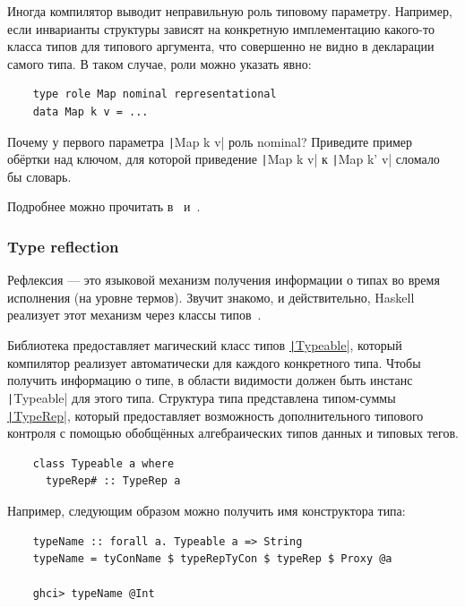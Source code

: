 Иногда компилятор выводит неправильную роль типовому параметру.
Например, если инварианты структуры зависят на конкретную имплементацию какого-то класса типов для типового аргумента, что совершенно не видно в декларации самого типа.
В таком случае, роли можно указать явно:
\begin{verbatim}
    type role Map nominal representational
    data Map k v = ...
\end{verbatim}

\begin{task}
    Почему у первого параметра \texttt|Map k v| роль nominal?
    Приведите пример обёртки над ключом, для которой приведение \texttt|Map k v| к \texttt|Map k' v| сломало бы словарь.
\end{task}

Подробнее можно прочитать в~\cite{breitner2014safe} и~\cite[глава 8]{maguire-types}.

\subsubsection{Type reflection} \label{subsubsec:type-reflection}

Рефлексия --- это языковой механизм получения информации о типах во время исполнения (на уровне термов).
Звучит знакомо, и действительно, Haskell реализует этот механизм через классы типов~\cite{peyton2016reflection}.

Библиотека предоставляет магический класс типов \href{https://hackage.haskell.org/package/base-4.20.0.1/docs/Type-Reflection.html}{\texttt|Typeable|}, который компилятор реализует автоматически для каждого конкретного типа.
Чтобы получить информацию о типе, в области видимости должен быть инстанс \texttt|Typeable| для этого типа.
Структура типа представлена типом-суммы \href{https://hackage.haskell.org/package/ghc-internal-9.1001.0/docs/src/GHC.Internal.Data.Typeable.Internal.html#TypeRep}{\texttt|TypeRep|}, который предоставляет возможность дополнительного типового контроля с помощью обобщённых алгебраических типов данных и типовых тегов.
\begin{verbatim}
    class Typeable a where
      typeRep# :: TypeRep a
\end{verbatim}

Например, следующим образом можно получить имя конструктора типа:
\begin{verbatim}
    typeName :: forall a. Typeable a => String
    typeName = tyConName $ typeRepTyCon $ typeRep $ Proxy @a

    ghci> typeName @Int
\end{verbatim}

